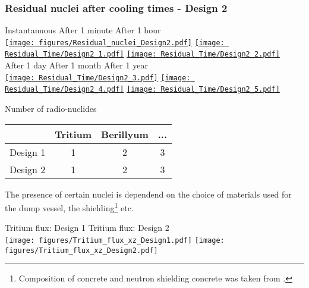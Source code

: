 \documentclass[xcolor={dvipsnames}]{beamer}
\begin{document}
\begin{frame}
  \frametitle{Residual nuclei after cooling times - Design 2}
  \hypertarget{residualtimesprev_Design2}{}
  \centering
    \hspace*{1.6cm} Instantanuous \hfill After 1 minute \hfill After 1 hour \hspace*{1.8cm} \\
  \hyperlink{Residual_nuclei_Design2}{\texttt{[image: figures/Residual\_nuclei\_Design2.pdf]}}
  \hyperlink{Residual_nuclei_minute_Design2}{\texttt{[image: Residual\_Time/Design2\_1.pdf]}}
  \hyperlink{Residual_nuclei_hour_Design2}{\texttt{[image: Residual\_Time/Design2\_2.pdf]}}\\
    \hspace*{1.6cm} After 1 day \hfill After 1 month \hfill After 1 year\hspace*{1.8cm} \\
  \hyperlink{Residual_nuclei_day_Design2}{\texttt{[image: Residual\_Time/Design2\_3.pdf]}}
  \hyperlink{Residual_nuclei_month_Design2}{\texttt{[image: Residual\_Time/Design2\_4.pdf]}}
  \hyperlink{Residual_nuclei_year_Design2}{\texttt{[image: Residual\_Time/Design2\_5.pdf]}}
\end{frame}

\begin{frame}{Number of radio-nuclides}
\begin{center}
\begin{tabular}{|c|c|c|c|}
\hline
 & Tritium & Berillyum & ... \\
\hline
Design 1 & 1 & 2 & 3\\
\hline
\hline
Design 2 & 1 & 2 & 3\\
\hline
\end{tabular}
\end{center}

The presence of certain nuclei is dependend on the choice of materials used for the dump vessel, the shielding\footnote{Composition of concrete and neutron shielding concrete was taken from \cite{Concrete}.} etc.

\centering
\hspace*{1.6cm} Tritium flux: Design 1 \hfill Tritium flux: Design 2 \hspace*{1.8cm} \\
  \texttt{[image: figures/Tritium\_flux\_xz\_Design1.pdf]}
    \texttt{[image: figures/Tritium\_flux\_xz\_Design2.pdf]}
\end{frame}
\end{document}
